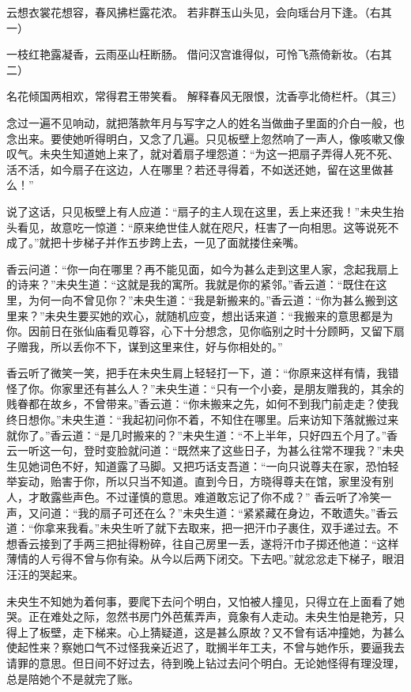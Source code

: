 \documentclass[a4paper,12pt,UTF8,twoside]{ctexbook}
\begin{document}
云想衣裳花想容，春风拂栏露花浓。
若非群玉山头见，会向瑶台月下逢。（右其一）

一枝红艳露凝香，云雨巫山枉断肠。
借问汉宫谁得似，可怜飞燕倚新妆。（右其二）

名花倾国两相欢，常得君王带笑看。
解释春风无限恨，沈香亭北倚栏杆。（其三）

念过一遍不见响动，就把落款年月与写字之人的姓名当做曲子里面的介白一般，也念出来。要使她听得明白，又念了几遍。只见板壁上忽然响了一声人，像咳嗽又像叹气。未央生知道她上来了，就对着扇子埋怨道：“为这一把扇子弄得人死不死、活不活，如今扇子在这边，人在哪里？若还寻得着，不如送还她，留在这里做甚么！”

说了这话，只见板壁上有人应道：“扇子的主人现在这里，丢上来还我！”未央生抬头看见，故意吃一惊道：“原来绝世佳人就在咫尺，枉害了一向相思。这等说死不成了。”就把十步梯子并作五步跨上去，一见了面就搂住亲嘴。

香云问道：“你一向在哪里？再不能见面，如今为甚么走到这里人家，念起我扇上的诗来？”未央生道：“这就是我的寓所。我就是你的紧邻。”香云道：“既住在这里，为何一向不曾见你？”未央生道：“我是新搬来的。”香云道：“你为甚么搬到这里来？”未央生要买她的欢心，就随机应变，想出话来道：“我搬来的意思都是为你。因前日在张仙庙看见尊容，心下十分想念，见你临别之时十分顾眄，又留下扇子赠我，所以丢你不下，谋到这里来住，好与你相处的。”

香云听了微笑一笑，把手在未央生肩上轻轻打一下，道：“你原来这样有情，我错怪了你。你家里还有甚么人？”未央生道：“只有一个小妾，是朋友赠我的，其余的贱眷都在故乡，不曾带来。”香云道：“你未搬来之先，如何不到我门前走走？使我终日想你。”未央生道：“我起初问你不着，不知住在哪里。后来访知下落就搬过来就你了。”香云道：“是几时搬来的？”未央生道：“不上半年，只好四五个月了。”香云一听这一句，登时变脸就问道：“既然来了这些日子，为甚么往常不理我？”未央生见她词色不好，知道露了马脚。又把巧话支吾道：“一向只说尊夫在家，恐怕轻举妄动，贻害于你，所以只当不知道。直到今日，方晓得尊夫在馆，家里没有别人，才敢露些声色。不过谨慎的意思。难道敢忘记了你不成？” 香云听了冷笑一声，又问道：“我的扇子可还在么？”未央生道：“紧紧藏在身边，不敢遗失。”香云道：“你拿来我看。”未央生听了就下去取来，把一把汗巾子裹住，双手递过去。不想香云接到了手两三把扯得粉碎，往自己房里一丢，遂将汗巾子掷还他道：“这样薄情的人亏得不曾与你有染。从今以后两下闭交。下去吧。”就忿忿走下梯子，眼泪汪汪的哭起来。

未央生不知她为着何事，要爬下去问个明白，又怕被人撞见，只得立在上面看了她哭。正在难处之际，忽然书房门外芭蕉弄声，竟象有人走动。未央生怕是艳芳，只得上了板壁，走下梯来。心上猜疑道，这是甚么原故？又不曾有话冲撞她，为甚么使起性来？察她口气不过怪我亲近迟了，耽搁半年工夫，不曾与她作乐，要逼我去请罪的意思。但日间不好过去，待到晚上钻过去问个明白。无论她怪得有理没理，总是陪她个不是就完了账。
\end{document}

